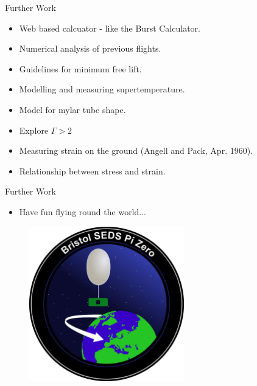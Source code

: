 \documentclass{beamer}
\begin{document}
\begin{frame}{Further Work}

  \begin{itemize}
  \item Web based calcuator - like the Burst Calculator.
  \item Numerical analysis of previous flights.
  \item Guidelines for minimum free lift.
  \item Modelling and measuring supertemperature.
  \item Model for mylar tube shape.
  \item Explore $\Gamma > 2$
  \item Measuring strain on the ground (Angell and Pack, Apr. 1960).
  \item Relationship between stress and strain.

  \end{itemize}

\end{frame}

\begin{frame}{Further Work}

  \begin{itemize}
  \item Have fun flying round the world...
  \end{itemize}

  \begin{figure}[!ht]
    \centering
    \includegraphics[width=0.6\textwidth]{pico-pi-logo.png}
  \end{figure}

\end{frame}
\end{document}
